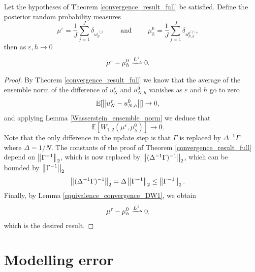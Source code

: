 \documentclass[10pt]{article}
\begin{document}
\begin{theorem}
\label{convergence_posterior_distributions}
Let the hypotheses of Theorem \ref{convergence_result_full} be satisfied. Define the posterior random probability measures
\[ \mu^{\varepsilon} = \frac{1}{J} \sum_{j=1}^J \delta_{u_N^{\varepsilon^{(j)}}} \qquad \text{ and } \qquad \mu_h^{0} = \frac{1}{J} \sum_{j=1}^J \delta_{u_{N,h}^{0^{(j)}}}, \]
then as $\varepsilon, h \to 0$
\[ \mu^{\varepsilon} - \mu_h^0 \xrightharpoonup{L^1} 0. \]
\end{theorem}
\begin{proof}
By Theorem \ref{convergence_result_full} we know that the average of the ensemble norm of the difference of $u_N^{\varepsilon}$ and $u_{N,h}^0$ vanishes as $\varepsilon$ and $h$ go to zero
\[ \mathbb{E} [ \left\|u_N^{\varepsilon} - u_{N,h}^0\right\| ] \to 0, \]
and applying Lemma \ref{Wasserstein_ensemble_norm} we deduce that 
\[ \mathbb{E} [ W_{1,2}(\mu^{\varepsilon}, \mu_h^0) ] \to 0. \]
Note that the only difference in the update step is that $\Gamma$ is replaced by $\Delta^{-1} \Gamma$ where $\Delta = 1/N$. The constants of the proof of Theorem \ref{convergence_result_full} depend on $\left\|\Gamma^{-1}\right\|_2$, which is now replaced by $\left\|(\Delta^{-1} \Gamma)^{-1}\right\|_2$, which can be bounded by $\left\|\Gamma^{-1}\right\|_2$ 
\[ \left\|(\Delta^{-1} \Gamma)^{-1}\right\|_2 = \Delta \left\|\Gamma^{-1}\right\|_2 \le \left\|\Gamma^{-1}\right\|_2. \]
Finally, by Lemma \ref{equivalence_convergence_DW1}, we obtain
\[ \mu^{\varepsilon} - \mu_h^0 \xrightharpoonup{L^1} 0, \]
which is the desired result.
\end{proof}

\section{Modelling error}\label{Modelling}
\end{document}
